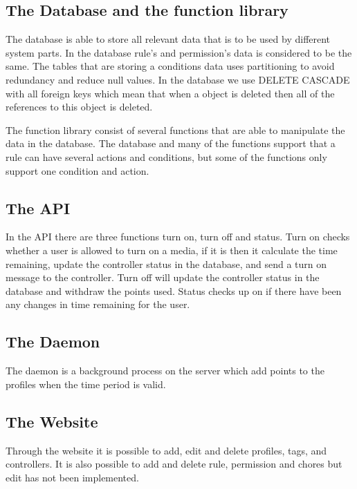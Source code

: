 \subsection*{The Database and the function library}
The database is able to store all relevant data that is to be used by different system parts. In the database rule's and permission's data is considered to be the same. The tables that are storing a conditions data uses partitioning to avoid redundancy and reduce null values. In the database we use DELETE CASCADE with all foreign keys which mean that when a object is deleted then all of the references to this object is deleted.

The function library consist of several functions that are able to manipulate the data in the database. The database and many of the functions support that a rule can have several actions and conditions, but some of the functions only support one condition and action.
 
\subsection*{The API}
In the API there are three functions turn on, turn off and status. Turn on checks whether a user is allowed to turn on a media, if it is then it calculate the time remaining, update the controller status in the database, and send a turn on message to the controller. Turn off will update the controller status in the database and withdraw the points used. Status checks up on if there have been any changes in time remaining for the user.

\subsection*{The Daemon}
The daemon is a background process on the server which add points to the profiles when the time period is valid. 

\subsection*{The Website}
Through the website it is possible to add, edit and delete profiles, tags, and controllers. It is also possible to add and delete rule, permission and chores but edit has not been implemented. 

